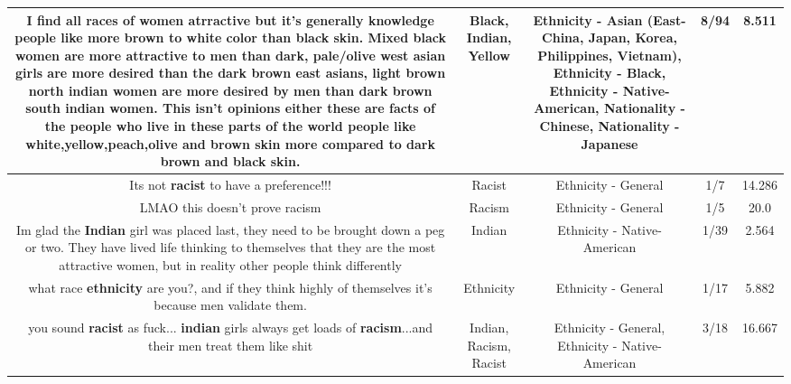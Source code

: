 \documentclass[11pt]{article}
\newlength\mylength
\begin{document}
\begin{center}
\begin{longtable}{|C{.65\mylength}|C{.30\mylength}|C{.12\mylength}|C{.12\mylength}|C{.12\mylength}|}
  \small {} I find all races of women atrractive but it's generally knowledge people like more brown to white color than \textbf{black} skin. Mixed \textbf{black} women are more attractive to men than dark, pale/olive west asian girls are more desired than the dark brown east asians, light brown north \textbf{indian} women are more desired by men than dark brown south \textbf{indian} women. This isn't opinions either these are facts of the people who live in these parts of the world people like white,\textbf{y\textbf{e\textbf{llow}}},peach,olive and brown skin more compared to dark brown and \textbf{black} skin.\normalsize   & Black, Indian, Yellow & Ethnicity - Asian (East- China, Japan, Korea, Philippines, Vietnam), Ethnicity - Black, Ethnicity - Native-American, Nationality - Chinese, Nationality - Japanese & 8/94 & 8.511 \\  \hline
  \small Its not \textbf{racist} to have a preference!!!\normalsize   & Racist & Ethnicity - General & 1/7 & 14.286 \\  \hline
  \small LMAO this doesn't prove racism\normalsize   & Racism & Ethnicity - General & 1/5 & 20.0 \\  \hline
  \small Im glad the \textbf{Indian} girl was placed last, they need to be brought down a peg or two. They have lived life thinking to themselves that they are the most attractive women, but in reality other people think differently\normalsize   & Indian & Ethnicity - Native-American & 1/39 & 2.564 \\  \hline
  \small what race \textbf{ethnicity} are you?, and if they think highly of themselves it's because men validate them.\normalsize   & Ethnicity & Ethnicity - General & 1/17 & 5.882 \\  \hline
  \small you sound \textbf{racist} as fuck... \textbf{indian} girls always get loads of \textbf{racism}...and their men treat them like shit\normalsize   & Indian, Racism, Racist & Ethnicity - General, Ethnicity - Native-American & 3/18 & 16.667 \\  \hline

\end{longtable}
\end{center}
\end{document}
